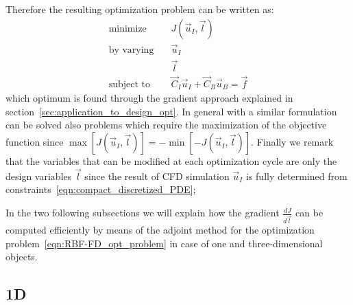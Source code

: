 Therefore the resulting optimization problem can be written as:
\begin{equation}
	\label{eqn:RBF-FD_opt_problem}
	\begin{aligned}
		\text{minimize} & \quad J(\vec{u}_I, \vec{l})								\\
		\text{by varying} & \quad \vec{u}_I											\\
						& \quad \vec{l} 											\\
		\text{subject to} & \quad \vec{C}_I \vec{u}_I + \vec{C}_B \vec{u}_B = \vec{f}					
	\end{aligned}
\end{equation}
which optimum is found through the gradient approach explained in section~\ref{sec:application_to_design_opt}. In general with a similar formulation can be solved also problems which require the maximization of the objective function since $\max \left[ J(\vec{u}_I, \vec{l}) \right] = - \min \left[ - J(\vec{u}_I, \vec{l}) \right]$. Finally we remark that the variables that can be modified at each optimization cycle are only the design variables $\vec{l}$ since the result of CFD simulation $\vec{u}_I$ is fully determined from constraints~\eqref{eqn:compact_discretized_PDE};

In the two following subsections we will explain how the gradient $\frac{dJ}{d\vec{l}}$ can be computed efficiently by means of the adjoint method for the optimization problem~\eqref{eqn:RBF-FD_opt_problem} in case of one and three-dimensional objects.


\subsection{1D}
\label{subsec:adjoint_method_RBF-FD_1D}

